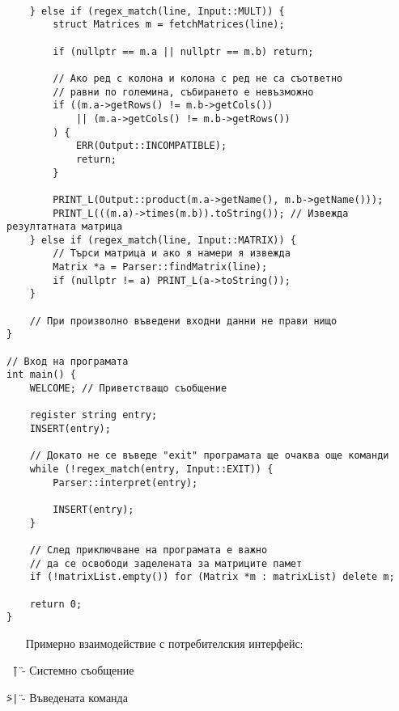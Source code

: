 \documentclass[oneside]{book}
\newcommand*{\code}[1]{\texttt{#1}}
\begin{document}
\begin{mdframed}\begin{lstlisting}[firstnumber=last]

	} else if (regex_match(line, Input::MULT)) {
		struct Matrices m = fetchMatrices(line);

		if (nullptr == m.a || nullptr == m.b) return;

		// Ако ред с колона и колона с ред не са съответно
		// равни по големина, събирането е невъзможно
		if ((m.a->getRows() != m.b->getCols())
			|| (m.a->getCols() != m.b->getRows())
		) {
			ERR(Output::INCOMPATIBLE);
			return;
		}

		PRINT_L(Output::product(m.a->getName(), m.b->getName()));
		PRINT_L(((m.a)->times(m.b)).toString()); // Извежда резултатната матрица
	} else if (regex_match(line, Input::MATRIX)) {
		// Търси матрица и ако я намери я извежда
		Matrix *a = Parser::findMatrix(line);
		if (nullptr != a) PRINT_L(a->toString());
	}

	// При произволно въведени входни данни не прави нищо
}

// Вход на програмата
int main() {
	WELCOME; // Приветстващо съобщение

	register string entry;
	INSERT(entry);

	// Докато не се въведе "exit" програмата ще очаква още команди
	while (!regex_match(entry, Input::EXIT)) {
		Parser::interpret(entry);

		INSERT(entry);
	}

	// След приключване на програмата е важно
	// да се освободи заделената за матриците памет
	if (!matrixList.empty()) for (Matrix *m : matrixList) delete m;

	return 0;
}
\end{lstlisting}\end{mdframed}

\begin{itemize}\item[Примерно] взаимодействие с потребителския интерфейс:\end{itemize}

\code{\"\ |\"} - Системно съобщение

\code{\"}\code{>|\"} - Въведената команда
\end{document}
